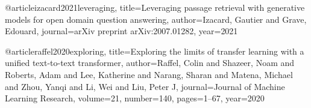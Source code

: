 @article{izacard2021leveraging,
  title={Leveraging passage retrieval with generative models for open domain question answering},
  author={Izacard, Gautier and Grave, Edouard},
  journal={arXiv preprint arXiv:2007.01282},
  year={2021}
}

@article{raffel2020exploring,
  title={Exploring the limits of transfer learning with a unified text-to-text transformer},
  author={Raffel, Colin and Shazeer, Noam and Roberts, Adam and Lee, Katherine and Narang, Sharan and Matena, Michael and Zhou, Yanqi and Li, Wei and Liu, Peter J},
  journal={Journal of Machine Learning Research},
  volume={21},
  number={140},
  pages={1--67},
  year={2020}
}